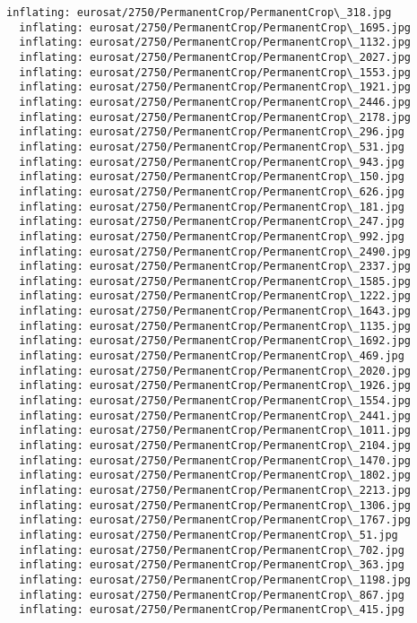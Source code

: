 \documentclass[11pt]{article}
\begin{document}
\begin{Verbatim}[commandchars=\\\{\}]
  inflating: eurosat/2750/PermanentCrop/PermanentCrop\_318.jpg
  inflating: eurosat/2750/PermanentCrop/PermanentCrop\_1695.jpg
  inflating: eurosat/2750/PermanentCrop/PermanentCrop\_1132.jpg
  inflating: eurosat/2750/PermanentCrop/PermanentCrop\_2027.jpg
  inflating: eurosat/2750/PermanentCrop/PermanentCrop\_1553.jpg
  inflating: eurosat/2750/PermanentCrop/PermanentCrop\_1921.jpg
  inflating: eurosat/2750/PermanentCrop/PermanentCrop\_2446.jpg
  inflating: eurosat/2750/PermanentCrop/PermanentCrop\_2178.jpg
  inflating: eurosat/2750/PermanentCrop/PermanentCrop\_296.jpg
  inflating: eurosat/2750/PermanentCrop/PermanentCrop\_531.jpg
  inflating: eurosat/2750/PermanentCrop/PermanentCrop\_943.jpg
  inflating: eurosat/2750/PermanentCrop/PermanentCrop\_150.jpg
  inflating: eurosat/2750/PermanentCrop/PermanentCrop\_626.jpg
  inflating: eurosat/2750/PermanentCrop/PermanentCrop\_181.jpg
  inflating: eurosat/2750/PermanentCrop/PermanentCrop\_247.jpg
  inflating: eurosat/2750/PermanentCrop/PermanentCrop\_992.jpg
  inflating: eurosat/2750/PermanentCrop/PermanentCrop\_2490.jpg
  inflating: eurosat/2750/PermanentCrop/PermanentCrop\_2337.jpg
  inflating: eurosat/2750/PermanentCrop/PermanentCrop\_1585.jpg
  inflating: eurosat/2750/PermanentCrop/PermanentCrop\_1222.jpg
  inflating: eurosat/2750/PermanentCrop/PermanentCrop\_1643.jpg
  inflating: eurosat/2750/PermanentCrop/PermanentCrop\_1135.jpg
  inflating: eurosat/2750/PermanentCrop/PermanentCrop\_1692.jpg
  inflating: eurosat/2750/PermanentCrop/PermanentCrop\_469.jpg
  inflating: eurosat/2750/PermanentCrop/PermanentCrop\_2020.jpg
  inflating: eurosat/2750/PermanentCrop/PermanentCrop\_1926.jpg
  inflating: eurosat/2750/PermanentCrop/PermanentCrop\_1554.jpg
  inflating: eurosat/2750/PermanentCrop/PermanentCrop\_2441.jpg
  inflating: eurosat/2750/PermanentCrop/PermanentCrop\_1011.jpg
  inflating: eurosat/2750/PermanentCrop/PermanentCrop\_2104.jpg
  inflating: eurosat/2750/PermanentCrop/PermanentCrop\_1470.jpg
  inflating: eurosat/2750/PermanentCrop/PermanentCrop\_1802.jpg
  inflating: eurosat/2750/PermanentCrop/PermanentCrop\_2213.jpg
  inflating: eurosat/2750/PermanentCrop/PermanentCrop\_1306.jpg
  inflating: eurosat/2750/PermanentCrop/PermanentCrop\_1767.jpg
  inflating: eurosat/2750/PermanentCrop/PermanentCrop\_51.jpg
  inflating: eurosat/2750/PermanentCrop/PermanentCrop\_702.jpg
  inflating: eurosat/2750/PermanentCrop/PermanentCrop\_363.jpg
  inflating: eurosat/2750/PermanentCrop/PermanentCrop\_1198.jpg
  inflating: eurosat/2750/PermanentCrop/PermanentCrop\_867.jpg
  inflating: eurosat/2750/PermanentCrop/PermanentCrop\_415.jpg

\end{Verbatim}
\end{document}
